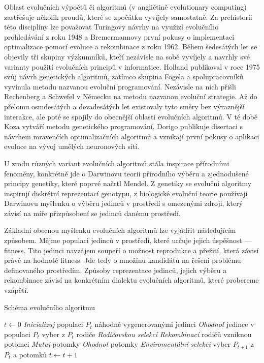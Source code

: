\documentclass[12pt,fleqn,a4paper,proc]{article}
\begin{document}
Oblast evolučních výpočtů či algoritmů (v angličtině evolutionary computing) zastřešuje několik proudů, které se zpočátku vyvíjely samostatně. Za prehistorii této disciplíny lze považovat Turingovy návrhy na využizí evolučního prohledávání z roku 1948 a Bremermannovy první pokusy o implementaci optimalizace pomocí evoluce a rekombinace z roku 1962. Během šedesátých let se objevily tři skupiny výzkumníků, kteří nezávisle na sobě vyvíjely a navrhly své varianty použití evolučních principů v informatice. Holland publikoval v roce 1975 svůj návrh genetických algoritmů, zatímco skupina Fogela a spolupracovníků vyvinula metodu nazvanou evoluční programování. Nezávisle na nich přišli Rechenberg a Schwefel v Německu na metodu nazvanou evoluční strategie. Až do přelomu osmdesátých a devadesátých let existovaly tyto směry bez výraznější interakce, ale poté se spojily do obecnější oblasti evolučních algoritmů. V té době  Koza vytváří metodu genetického programování, Dorigo publikuje disertaci s návrhem mravenčích optimalizačních algoritmů a vznikají první pokusy o aplikaci evoluce na vývoj umělých neuronových sítí. 

U zrodu různých variant evolučních algoritmů stála inspirace přírodními fenomény, konkrétně jde o Darwinovu teorii přírodního výběru a zjednodušené principy genetiky, které poprvé načrtl Mendel. Z genetiky se evoluční algoritmy inspirují diskrétní reprezentací genotypu, z biologické evoluční teorie používají Darwinovu myšlenku o výběru jedinců v prostředí s omezenými zdroji, který závisí na míře přizpůsobení se jedinců danému prostředí.

Základní obecnou myšlenku evolučních algoritmů lze vyjádřit následujícím způsobem. Mějme populaci jedinců v prostředí, které určuje jejich úspěšnost --- fitness. Tito jedinci navzájem soupeří o možnost reprodukce a přežití, která závisí právě na hodnotě fitness. Jde tedy o množinu kandidátů na řešeni problému definovaného prostředím. Způsoby reprezentace jedinců, jejich výběru a rekombinace závisí na konkrétním dialektu evolučních algoritmů, které probereme vzápětí. 

\begin{algorithm}
\caption{Schéma evolučního algoritmu}
\label{obreva}
\begin{algorithmic}
\State $t \gets 0$
\State \emph{Inicializuj} populaci $P_t$ náhodně vygenerovanými jedinci
\State \emph{Ohodnoť} jedince v populaci $P_t$
\State 	vyber z $P_t$ rodiče \emph{Rodičovskou selekcí}
\State 	\emph{Rekombinací} rodičů vzniknou potomci
\State 	\emph{Mutuj} potomky
\State 	\emph{Ohodnoť} potomky
\State 	\emph{Enviromentální selekcí} vyber $P_{t+1}$ z $P_t$ a potomků
\State $t \gets t+1$
\EndWhile
\EndProcedure
\end{algorithmic}
\end{algorithm}
\end{document}
